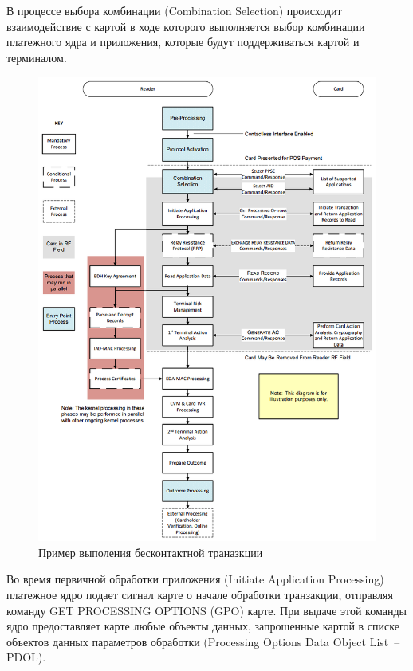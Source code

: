 В процессе выбора комбинации (Combination Selection) происходит взаимодействие с картой в ходе которого выполняется выбор комбинации платежного ядра и приложения, которые будут поддерживаться картой и терминалом.

\begin{figure}[H]
    \centering
    \includegraphics[width=1\textwidth]{images/research/kernel_transaction_flow}
    \caption{\centering Пример выполения бесконтактной траназкции}
    \label{fig:kernel_transaction_flow}
\end{figure}

Во время первичной обработки приложения (Initiate Application Processing) платежное ядро подает сигнал карте о начале обработки транзакции, отправляя команду GET PROCESSING OPTIONS (GPO) карте.
При выдаче этой команды ядро предоставляет карте любые объекты данных, запрошенные картой в списке объектов данных параметров обработки (Processing Options Data Object List~-- PDOL).


